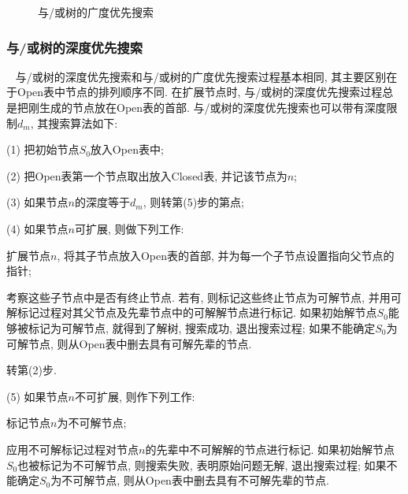 \begin{figure}[H]
\begin{center}
    \end{center}
    \caption{与/或树的广度优先搜索}
    \label{AI32fig41}
\end{figure}
\subsubsection{与/或树的深度优先搜索}~{}
    与/或树的深度优先搜索和与/或树的广度优先搜索过程基本相同, 其主要区别在于Open表中节点的排列顺序不同.
在扩展节点时, 与/或树的深度优先搜索过程总是把刚生成的节点放在Open表的首部.
与/或树的深度优先搜索也可以带有深度限制$d_m$, 其搜索算法如下:

(1) 把初始节点$S_0$放入Open表中;

(2) 把Open表第一个节点取出放入Closed表, 并记该节点为$n$;

(3) 如果节点$n$的深度等于$d_m$, 则转第(5)步的第点;

(4) 如果节点$n$可扩展, 则做下列工作:

   \quad{} 扩展节点$n$, 将其子节点放入Open表的首部, 并为每一个子节点设置指向父节点的指针;

    \quad{} 考察这些子节点中是否有终止节点. 若有, 则标记这些终止节点为可解节点, 并用可解标记过程对其父节点及先辈节点中的可解解节点进行标记.
    如果初始解节点$S_0$能够被标记为可解节点, 就得到了解树, 搜索成功, 退出搜索过程; 如果不能确定$S_0$为可解节点, 则从Open表中删去具有可解先辈的节点.

   \quad{} 转第(2)步.

(5) 如果节点$n$不可扩展, 则作下列工作:

   \quad{} 标记节点$n$为不可解节点;

   \quad{} 应用不可解标记过程对节点$n$的先辈中不可解解的节点进行标记. 如果初始解节点$S_0$也被标记为不可解节点, 则搜索失败, 表明原始问题无解, 退出搜索过程;
                    如果不能确定$S_0$为不可解节点, 则从Open表中删去具有不可解先辈的节点.

